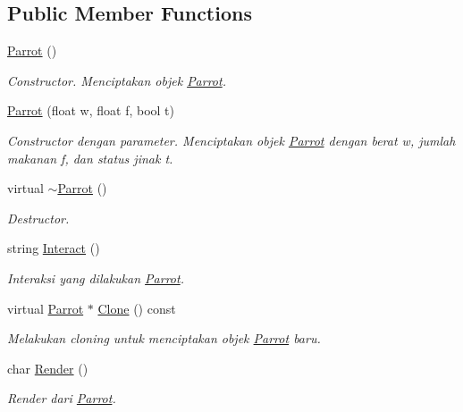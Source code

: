 \subsection*{Public Member Functions}
\begin{DoxyCompactItemize}
\item 
\hyperlink{classParrot_adfd08f638064b09dc46924ded14d1b32}{Parrot} ()
\begin{DoxyCompactList}\small\item\em Constructor. Menciptakan objek \hyperlink{classParrot}{Parrot}. \end{DoxyCompactList}\item 
\hyperlink{classParrot_a98ad57fac6ea488daf92b33c2d8ae57f}{Parrot} (float w, float f, bool t)
\begin{DoxyCompactList}\small\item\em Constructor dengan parameter. Menciptakan objek \hyperlink{classParrot}{Parrot} dengan berat w, jumlah makanan f, dan status jinak t. \end{DoxyCompactList}\item 
virtual \hyperlink{classParrot_a02300897ced64c5a28347d385f4f0f00}{$\sim$\+Parrot} ()
\begin{DoxyCompactList}\small\item\em Destructor. \end{DoxyCompactList}\item 
string \hyperlink{classParrot_a3fdf1aa0851d53d31b5d225d755e4995}{Interact} ()
\begin{DoxyCompactList}\small\item\em Interaksi yang dilakukan \hyperlink{classParrot}{Parrot}. \end{DoxyCompactList}\item 
virtual \hyperlink{classParrot}{Parrot} $\ast$ \hyperlink{classParrot_aec7fd1385827d67522e1baf3242078b0}{Clone} () const 
\begin{DoxyCompactList}\small\item\em Melakukan cloning untuk menciptakan objek \hyperlink{classParrot}{Parrot} baru. \end{DoxyCompactList}\item 
char \hyperlink{classParrot_a27c491ab4ae56491fbe8d74e494bc46d}{Render} ()
\begin{DoxyCompactList}\small\item\em Render dari \hyperlink{classParrot}{Parrot}. \end{DoxyCompactList}\end{DoxyCompactItemize}

